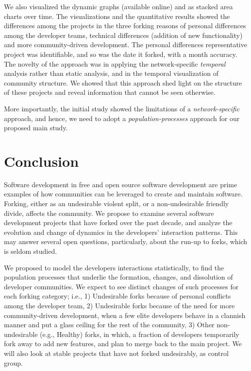 \documentclass{acm_proc_article-sp}
\begin{document}
We also visualized the dynamic graphs (available online) and as stacked area charts over time. The visualizations and the quantitative results showed the differences among the projects in the three forking reasons of personal differences among the developer teams, technical differences (addition of new functionality) and more community-driven development. The personal differences representative project was identifiable, and so was the date it forked, with a month accuracy. The novelty of the approach was in applying the network-specific \textit{temporal} analysis rather than static analysis, and in the temporal visualization of community structure. We showed that this approach shed light on the structure of these projects and reveal information that cannot be seen otherwise.

More importantly, the initial study showed the limitations of a \textit{network-specific} approach, and hence, we need to adopt a \textit{population-processes} approach for our proposed main study.

\section{Conclusion}
\label{conclusion}
Software development in free and open source software development are prime examples of how communities can be leveraged to create and maintain software. Forking, either as an undesirable violent split, or a non-undesirable friendly divide, affects the community. We propose to examine several software development projects that have forked over the past decade, and analyze the evolution and change of dynamics in the developers' interaction patterns. This may answer several open questions, particularly, about the run-up to forks, which is seldom studied.

We proposed to model the developers interactions statistically, to find the population processes that underlie the formation, changes, and dissolution of developer communities. We expect to see distinct changes of such processes for each forking category; i.e., 1) Undesirable forks because of personal conflicts among the developer team, 2) Undesirable forks because of the need for more community-driven development, when a few elite developers behave in a clannish manner and put a glass ceiling for the rest of the community, 3) Other non-undesirable (e.g., Healthy) forks, in which, a fraction of developers temporarily fork away to add new features, and plan to merge back to the main project. We will also look at stable projects that have not forked undesirably, as control group. 
\end{document}
